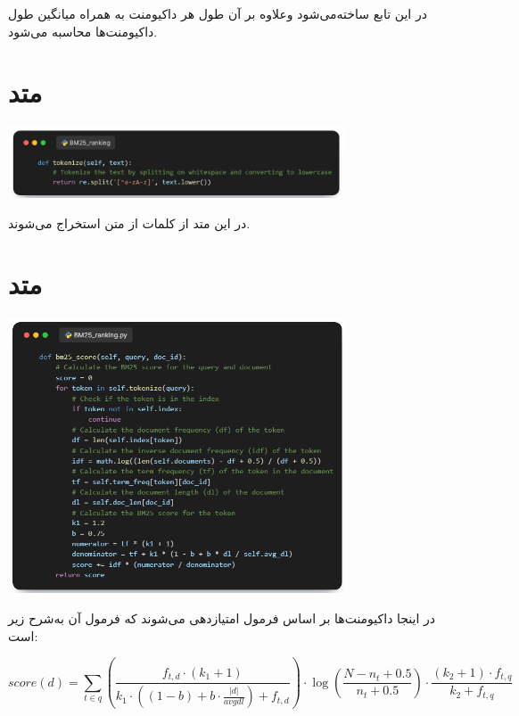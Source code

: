 \documentclass[12pt, dvipsnames, svgnames, x11names,]{article}
\begin{document}
		{\normalsize
			در این تابع  ساخته‌می‌شود وعلاوه بر آن طول هر داکیومنت به همراه میانگین طول داکیومنت‌ها محاسبه می‌شود.
		} \par

	
	
	\section{متد }
		
		\begin{center}
			{\includegraphics[width=10cm]{images/05.png}} \par
		\end{center}
		
		{\normalsize 
			در این متد از کلمات از متن استخراج می‌شوند.
		}
		
		
	
	\section{متد }
	
		\begin{center}
			{\includegraphics[width=10cm]{images/06.png}} \par
		\end{center}
		
		{\normalsize 
			در اینجا داکیومنت‌ها بر اساس فرمول  امتیازدهی می‌شوند که فرمول آن به‌شرح زیر است: 
		}
		
		$$
		 score(d) = \sum_{t \in q} \left( 
		 \frac{f_{t,d} \cdot (k_1 + 1)}
		 {k_1 \cdot \left( (1-b) + b \cdot \frac{|d|}{avgdl} \right) + f_{t,d}}
		 \right) \cdot \log\left( 
		 \frac{N - n_t + 0.5}{n_t + 0.5}
		 \right) \cdot 
		 \frac{(k_2 + 1) \cdot f_{t,q}}
		 {k_2 + f_{t,q}}
		 \label{eq:bm25_inverse_index}
		$$
\end{document}
